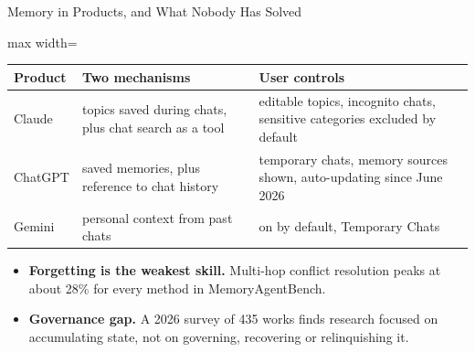 \begin{frame}{Memory in Products, and What Nobody Has Solved}
    \begin{center}
    \small
    \renewcommand{\arraystretch}{1.2}
    \begin{adjustbox}{max width=\linewidth}\begin{tabular}{>{\raggedright\arraybackslash}p{1.6cm}>{\raggedright\arraybackslash}p{5.0cm}>{\raggedright\arraybackslash}p{6.4cm}}
        \toprule
        \textbf{Product} & \textbf{Two mechanisms} & \textbf{User controls} \\
        \midrule
        Claude & topics saved during chats, plus chat search as a tool & editable topics, incognito chats, sensitive categories excluded by default \\
        ChatGPT & saved memories, plus reference to chat history & temporary chats, memory sources shown, auto-updating since June 2026 \\
        Gemini & personal context from past chats & on by default, Temporary Chats \\
        \bottomrule
    \end{tabular}\end{adjustbox}
    \end{center}
    \begin{itemize}\itemsep0.4em
        \item \textbf{Forgetting is the weakest skill.} Multi-hop conflict resolution peaks at about 28\% for every method in MemoryAgentBench.
        \item \textbf{Governance gap.} A 2026 survey of 435 works finds research focused on accumulating state, not on \alert{governing, recovering or relinquishing} it.
    \end{itemize}
\end{frame}

